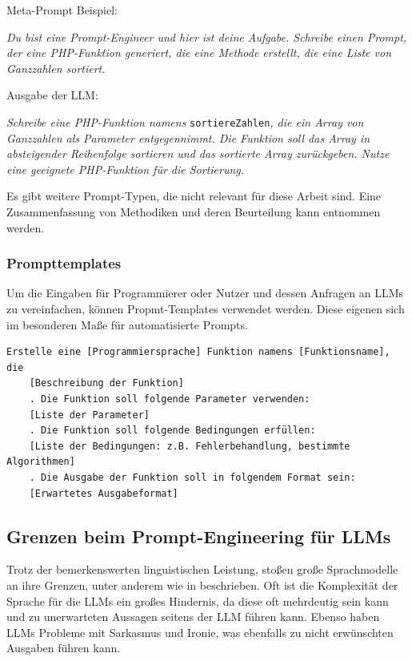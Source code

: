 Meta-Prompt Beispiel:

\textit{Du bist eine Prompt-Engineer und hier ist deine Aufgabe. Schreibe einen Prompt, der eine PHP-Funktion generiert, die eine Methode erstellt, die eine Liste von Ganzzahlen sortiert.}\vspace{0.2cm}

Ausgabe der LLM:

\textit{Schreibe eine PHP-Funktion namens} \texttt{sortiereZahlen}\textit{, die ein Array von Ganzzahlen als Parameter entgegennimmt. Die Funktion soll das Array in absteigender Reihenfolge sortieren und das sortierte Array zurückgeben. Nutze eine geeignete PHP-Funktion für die Sortierung.}\vspace{0.2cm}

Es gibt weitere Prompt-Typen, die nicht relevant für diese Arbeit sind. Eine Zusammenfassung von Methodiken und deren Beurteilung kann \cite{chen-2023} entnommen werden.


\subsubsection{Prompttemplates}
Um die Eingaben für Programmierer oder Nutzer und dessen Anfragen an LLMs zu vereinfachen, können Propmt-Templates verwendet werden. Diese eigenen sich im besonderen Maße für automatisierte Prompts.

\begin{lstlisting}[language=text]
	Erstelle eine [Programmiersprache] Funktion namens [Funktionsname], die 
	[Beschreibung der Funktion]
	. Die Funktion soll folgende Parameter verwenden:
	[Liste der Parameter]
	. Die Funktion soll folgende Bedingungen erfüllen:
	[Liste der Bedingungen: z.B. Fehlerbehandlung, bestimmte Algorithmen]
	. Die Ausgabe der Funktion soll in folgendem Format sein:
	[Erwartetes Ausgabeformat]
\end{lstlisting}


\subsection{Grenzen beim Prompt-Engineering für LLMs}
Trotz der bemerkenswerten linguistischen Leistung, stoßen große Sprachmodelle an ihre Grenzen, unter anderem wie in \cite{amatriain-2024} beschrieben. Oft ist die Komplexität der Sprache für die LLMs ein großes Hindernis, da diese oft mehrdeutig sein kann und zu unerwarteten Aussagen seitens der LLM führen kann. Ebenso haben LLMs Probleme mit Sarkasmus und Ironie, was ebenfalls zu nicht erwünschten Ausgaben führen kann.\vspace{0.2cm}

